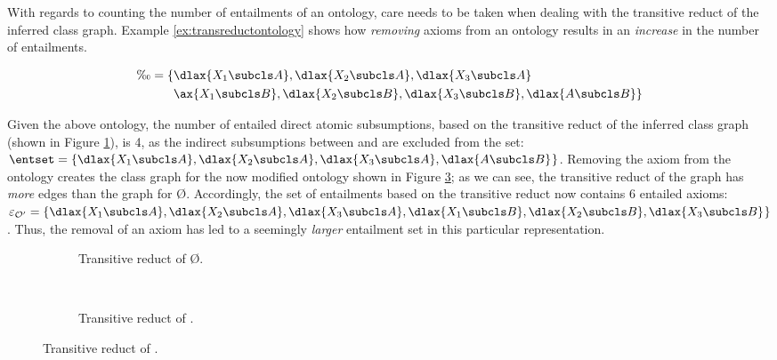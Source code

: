 With regards to counting the number of entailments of an ontology, care needs to be taken when dealing with the transitive reduct of the inferred class graph. Example \ref{ex:transreductontology} shows how \emph{removing} axioms from an ontology results in an \emph{increase} in the number of entailments.
\begin{examp}\begin{align*}
		\O = \{&\dlax{X_{1}  \subcls A}, \dlax{X_{2}  \subcls A}, \dlax{X_{3}  \subcls A}\\
		&\ax{X_{1}  \subcls B}, \dlax{X_{2}  \subcls B}, \dlax{X_{3}  \subcls B}, \dlax{A \subcls B} \}\end{align*}\label{ex:transreductontology}\end{examp}
Given the above ontology, the number of entailed direct atomic subsumptions, based on the transitive reduct of the inferred class graph (shown in Figure \ref{fig:inf-classgraph-before}), is 4, as the indirect subsumptions between  and  are excluded from the set: $\entset = \{\dlax{X_{1}  \subcls A},  \dlax{X_{2}  \subcls A}, \dlax{X_{3}  \subcls A}, \dlax{A  \subcls B} \!\:\}$. Removing the axiom  from the ontology creates the class graph for the now modified ontology \oprime shown in Figure \ref{fig:inf-classgraph-after}; as we can see, the transitive reduct of the graph has \emph{more} edges than the graph for \O. Accordingly, the set of entailments based on the transitive reduct now contains 6 entailed axioms: $\varepsilon_{\oprime} = \{\dlax{X_{1}  \subcls A},  \dlax{X_{2}  \subcls A}, \dlax{X_{3}  \subcls A}, \dlax{X_{1}  \subcls B},  \dlax{X_{2}  \subcls B}, \dlax{X_{3}  \subcls B}\!\:\}$. Thus, the removal of an axiom has led to a seemingly \emph{larger} entailment set in this particular representation.

\begin{figure}
\centering
		\begin{subfigure}{0.5\textwidth}
                \centering
                
                \caption{Transitive reduct of \O.}
        	\label{fig:inf-classgraph-before}
        \end{subfigure}%
        ~ %
		\begin{subfigure}{0.5\textwidth}
                \centering
                
                \caption{Transitive reduct of \oprime.}
        	\label{fig:inf-classgraph-after}
        \end{subfigure}
\end{figure}

